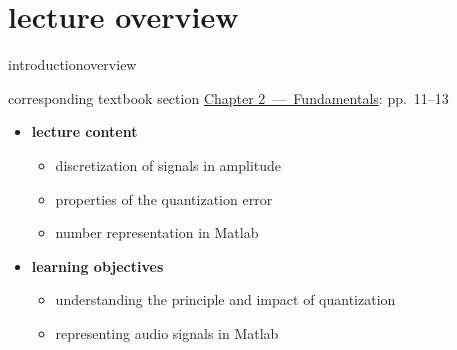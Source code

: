 




\subtitle{Module 2.2: Fundamentals~---~Quantization}


	

    \section[overview]{lecture overview}
        \begin{frame}{introduction}{overview}
            \begin{block}{corresponding textbook section}
                    \href{http://ieeexplore.ieee.org/xpl/articleDetails.jsp?tp=&arnumber=6331119&}{Chapter 2~---~Fundamentals}: pp.~11--13
            \end{block}

            \begin{itemize}
                \item   \textbf{lecture content}
                    \begin{itemize}
                        \item   discretization of signals in amplitude
                        \item   properties of the quantization error
                        \item   number representation in Matlab
                    \end{itemize}
                \bigskip
                \item<2->   \textbf{learning objectives}
                    \begin{itemize}
                        \item   understanding the principle and impact of quantization
                        \item   representing audio signals in Matlab
                    \end{itemize}
            \end{itemize}
        \end{frame}
        
